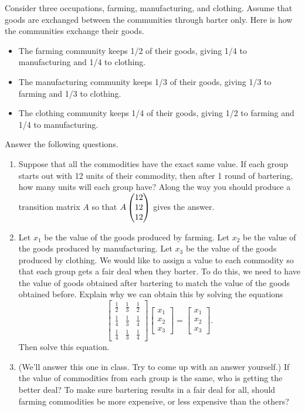 \begin{problem}
Consider three occupations, farming, manufacturing, and clothing.  Assume that goods are exchanged between the communities through barter only. Here is how the communities exchange their goods.
\begin{itemize}
 \item The farming community keeps 1/2 of their goods, giving 1/4 to manufacturing and 1/4 to clothing.
 \item The manufacturing community keeps 1/3 of their goods, giving 1/3 to farming and 1/3 to clothing.
 \item The clothing community keeps 1/4 of their goods, giving 1/2 to farming and 1/4 to manufacturing.
\end{itemize}
Answer the following questions.
\begin{enumerate}
\item Suppose that all the commodities have the exact same value.  If each group starts out with 12 units of their commodity, then after 1 round of bartering, how many units will each group have?  Along the way you should produce a transition matrix $A$ so that $A\begin{pmatrix} 12\\12\\12 \end{pmatrix}$ gives the answer.
\item Let $x_1$ be the value of the goods produced by farming. Let $x_2$ be the value of the goods produced by manufacturing. Let $x_3$ be the value of the goods produced by clothing.   We would like to assign a value to each commodity so that each group gets a fair deal when they barter.  To do this, we need to have the value of goods obtained after bartering to match the value of the goods obtained before.  Explain why we can obtain this by solving the equations
$$\begin{bmatrix}
   \frac{1}{2}& \frac{1}{3}& \frac{1}{2}\\
   \frac{1}{4}& \frac{1}{3}& \frac{1}{4}\\
   \frac{1}{4}& \frac{1}{3}& \frac{1}{4}
  \end{bmatrix}
\begin{bmatrix}
 x_1\\x_2\\x_3
\end{bmatrix}
=
\begin{bmatrix}
 x_1\\x_2\\x_3
\end{bmatrix}.
$$  
Then solve this equation.
\item  (We'll answer this one in class.  Try to come up with an answer yourself.) 
If the value of commodities from each group is the same, who is getting the better deal?  To make sure bartering results in a fair deal for all, should farming commodities be more expensive, or less expensive than the others? 
\end{enumerate}
\end{problem}




